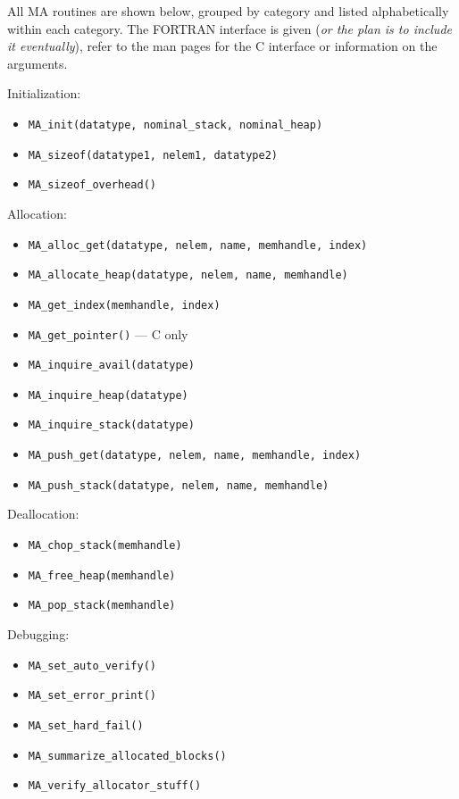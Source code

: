 All MA routines are shown below, grouped by category and listed
alphabetically within each category.  The FORTRAN interface is given
({\em or the plan is to include it eventually}),
refer to the man pages for the C interface or information on the
arguments.

Initialization: 
\begin{itemize}
\item {\tt MA\_init(datatype, nominal\_stack, nominal\_heap)}
\item {\tt MA\_sizeof(datatype1, nelem1, datatype2)}
\item {\tt MA\_sizeof\_overhead()}
\end{itemize}

Allocation:
\begin{itemize}
\item {\tt MA\_alloc\_get(datatype, nelem, name, memhandle, index)}
\item {\tt MA\_allocate\_heap(datatype, nelem, name, memhandle)}
\item {\tt MA\_get\_index(memhandle, index)}
\item {\tt MA\_get\_pointer()} --- C only
\item {\tt MA\_inquire\_avail(datatype)}
\item {\tt MA\_inquire\_heap(datatype)}
\item {\tt MA\_inquire\_stack(datatype)}
\item {\tt MA\_push\_get(datatype, nelem, name, memhandle, index)}
\item {\tt MA\_push\_stack(datatype, nelem, name, memhandle)}
\end{itemize}

Deallocation:
\begin{itemize}
\item {\tt MA\_chop\_stack(memhandle)}
\item {\tt MA\_free\_heap(memhandle)}
\item {\tt MA\_pop\_stack(memhandle)}
\end{itemize}

Debugging:
\begin{itemize}
\item {\tt MA\_set\_auto\_verify()}
\item {\tt MA\_set\_error\_print()}
\item {\tt MA\_set\_hard\_fail()}
\item {\tt MA\_summarize\_allocated\_blocks()}
\item {\tt MA\_verify\_allocator\_stuff()}
\end{itemize}

